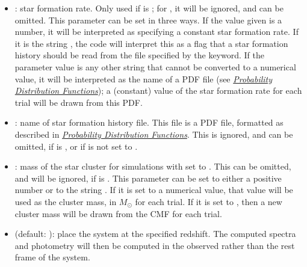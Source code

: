 \documentclass[letterpaper,10pt,english]{sphinxmanual}
\begin{document}
\begin{itemize}
\item {} 
: star formation rate. Only used if  is ; for , it will be ignored, and can be omitted. This parameter can be set in three ways. If the value given is a number, it will be interpreted as specifying a constant star formation rate. If it is the string , the code will interpret this as a flag that a star formation history should be read from the file specified by the  keyword. If the parameter value is any other string that cannot be converted to a numerical value, it will be interpreted as the name of a PDF file (see {\hyperref[pdfs:sec\string-pdfs]{\emph{Probability Distribution Functions}}}); a (constant) value of the star formation rate for each trial will be drawn from this PDF.

\item {} 
: name of star formation history file. This file is a PDF file, formatted as described in {\hyperref[pdfs:sec\string-pdfs]{\emph{Probability Distribution Functions}}}. This is ignored, and can be omitted, if  is , or if  is not set to .

\item {} 
: mass of the star cluster for simulations with  set to . This can be omitted, and will be ignored, if  is . This parameter can be set to either a positive number or to the string . If it is set to a numerical value, that value will be used as the cluster mass, in \(M_\odot\) for each trial. If it is set to , then a new cluster mass will be drawn from the CMF for each trial.

\item {} 
 (default: ): place the system at the specified redshift. The computed spectra and photometry will then be computed in the observed rather than the rest frame of the system.

\end{itemize}
\end{document}
